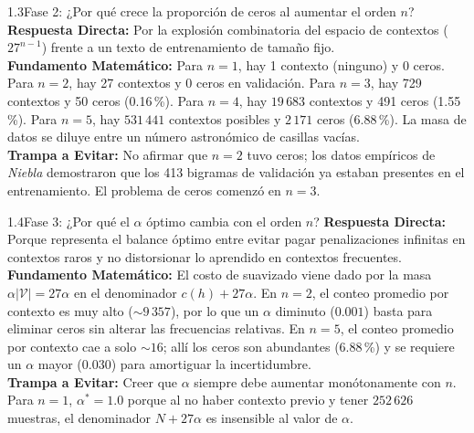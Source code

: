 \documentclass[11pt,letterpaper]{article}
\begin{document}
\begin{qbox}{1.3}{Fase 2: ¿Por qué crece la proporción de ceros al aumentar el orden $n$?}
\textbf{Respuesta Directa:} Por la explosión combinatoria del espacio de contextos ($27^{n-1}$) frente a un texto de entrenamiento de tamaño fijo.\\[3pt]
\textbf{Fundamento Matemático:} Para $n=1$, hay 1 contexto (ninguno) y 0 ceros. Para $n=2$, hay 27 contextos y 0 ceros en validación. Para $n=3$, hay 729 contextos y 50 ceros (0.16\,\%). Para $n=4$, hay $19\,683$ contextos y 491 ceros (1.55\,\%). Para $n=5$, hay $531\,441$ contextos posibles y $2\,171$ ceros (6.88\,\%). La masa de datos se diluye entre un número astronómico de casillas vacías.\\[3pt]
\textbf{Trampa a Evitar:} No afirmar que $n=2$ tuvo ceros; los datos empíricos de \textit{Niebla} demostraron que los 413 bigramas de validación ya estaban presentes en el entrenamiento. El problema de ceros comenzó en $n=3$.
\end{qbox}

\begin{qbox}{1.4}{Fase 3: ¿Por qué el $\alpha$ óptimo cambia con el orden $n$?}
\textbf{Respuesta Directa:} Porque representa el balance óptimo entre evitar pagar penalizaciones infinitas en contextos raros y no distorsionar lo aprendido en contextos frecuentes.\\[3pt]
\textbf{Fundamento Matemático:} El costo de suavizado viene dado por la masa $\alpha |\mathcal{V}| = 27\alpha$ en el denominador $c(h) + 27\alpha$. En $n=2$, el conteo promedio por contexto es muy alto ($\sim 9\,357$), por lo que un $\alpha$ diminuto ($0.001$) basta para eliminar ceros sin alterar las frecuencias relativas. En $n=5$, el conteo promedio por contexto cae a solo $\sim 16$; allí los ceros son abundantes (6.88\,\%) y se requiere un $\alpha$ mayor ($0.030$) para amortiguar la incertidumbre.\\[3pt]
\textbf{Trampa a Evitar:} Creer que $\alpha$ siempre debe aumentar monótonamente con $n$. Para $n=1$, $\alpha^*=1.0$ porque al no haber contexto previo y tener $252\,626$ muestras, el denominador $N + 27\alpha$ es insensible al valor de $\alpha$.
\end{qbox}
\end{document}
